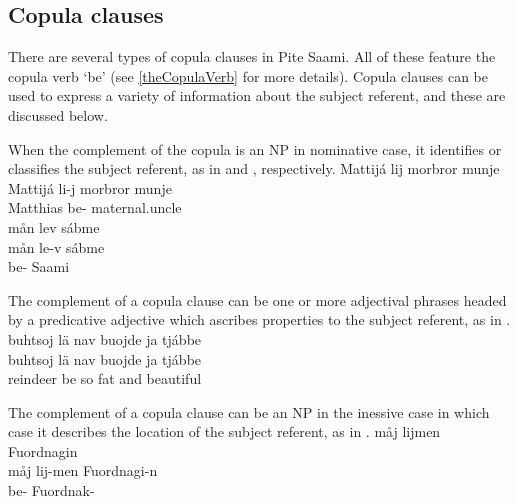 \subsection{Copula clauses}\label{copulaClauses}
There are several types of copula clauses in Pite Saami. All of these feature the copula verb  ‘be’ %
(see \SEC\ref{theCopulaVerb} for more details). 
Copula clauses can be used to express a variety of information about the subject referent, and these are discussed below. 

When the complement of the copula is an NP in nominative case, it identifies or classifies the subject referent, as in  and , respectively.
\ea\label{copula1}
\glll	Mattijá lij morbror munje\\
	Mattijá li-j {morbror\footnotemark} munje\\
	Matthias\BS{} be- maternal.uncle\BS{} \\\nopagebreak
{} %
\z
\ea\label{copula2}
\glll	mån lev sábme\\
	mån le-v sábme\\
	 be- Saami\BS{}\\\nopagebreak
{} 
\z
{}

The complement of a copula clause can be one or more adjectival phrases headed by a predicative adjective which ascribes properties to the subject referent, as in .
\ea\label{copula3}
\glll	buhtsoj lä nav buojde ja tjábbe\\
	buhtsoj lä nav buojde ja tjábbe\\
	reindeer\BS{} be\BS{} so fat\BS{} and beautiful\BS{}\\\nopagebreak
{} 
\z

The complement of a copula clause can be an NP in the inessive case in which case it describes the location of the subject referent, as in .
\ea\label{copula4}
\glll	måj lijmen Fuordnagin\\
	måj lij-men Fuordnagi-n\\
	 be- Fuordnak-\\\nopagebreak
{} 
\z

